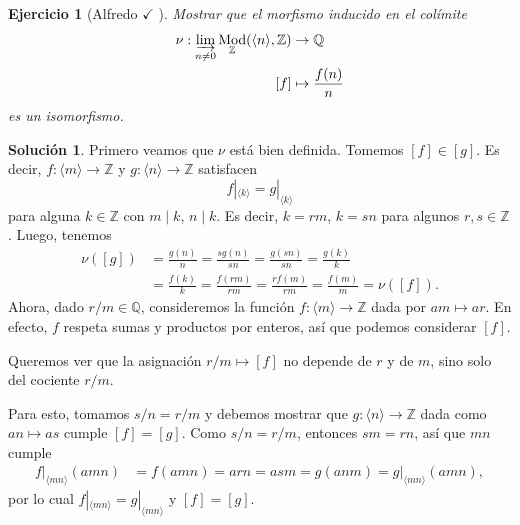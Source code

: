 \documentclass[12pt,letterpaper,titlepage]{article}
\newtheorem{exe}{Ejercicio}
\theoremstyle{definition}
\newtheorem*{sol}{Solución}
\newcommand\Z{\mathbb Z}
\newcommand\Q{\mathbb Q}
\newcommand\<{\langle}
\renewcommand\>{\rangle}
\DeclareMathOperator{\Mod}{Mod}
\begin{document}
\begin{exe}[Alfredo $\checkmark$ ]
  Mostrar que el morfismo inducido en el colímite
  \begin{align*}
      \nu : \varinjlim_{n\neq 0}\Mod_\Z(\<n\>,\Z)&\to \Q \\
      [f] &\mapsto \frac{f(n)}{n}
  \end{align*}
  es un isomorfismo.
\end{exe}
\begin{sol}
    Primero veamos que $\nu$ está bien definida.
    Tomemos $[f]\in [g]$.
    Es decir, $f:\<m\>\to\Z$ y $g:\<n\>\to\Z$ satisfacen
    \[
        f|_{\<k\>} = g|_{\<k\>}
    \]
    para alguna $k\in\Z$ con $m\mid k$, $n\mid k$.
    Es decir, $k=rm$, $k=sn$ para algunos $r,s\in\Z$.
    Luego, tenemos
    \begin{align*}
        \nu([g])
        &= \frac {g(n)} n
        = \frac {sg(n)}{sn} 
        = \frac {g(sn)}{sn} 
        = \frac {g(k)}{k} \\
        &= \frac {f(k)}{k} 
        = \frac {f(rm)}{rm} 
        = \frac {rf(m)}{rm} 
        = \frac {f(m)}{m} 
        = \nu([f]).
    \end{align*}
    Ahora, dado $r/m\in\Q$, consideremos la función
    $f:\<m\>\to\Z$ dada por $am\mapsto ar$.
    En efecto, $f$ respeta sumas y productos por enteros,
    así que podemos considerar $[f]$.
    
    Queremos ver que la asignación $r/m\mapsto [f]$ no
    depende de $r$ y de $m$, sino solo del cociente $r/m$.
    
    Para esto, tomamos $s/n=r/m$ y
    debemos mostrar que $g:\<n\>\to\Z$
    dada como $an\mapsto as$ cumple $[f]=[g]$.
    Como $s/n=r/m$, entonces $sm=rn$, así que $mn$ cumple
    \begin{align*}
        f|_{\<mn\>}(amn)
        &= f(amn)
        = arn
        = asm
        = g(anm)
        = g|_{\<mn\>}(amn),
    \end{align*}
    por lo cual $f|_{\<mn\>}=g|_{\<mn\>}$ y $[f]=[g]$.
    

\end{sol}
\end{document}

